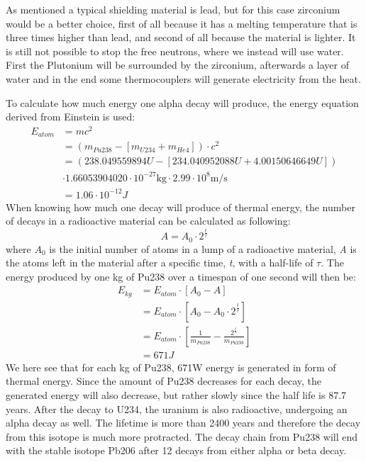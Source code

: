 As mentioned a typical shielding material is lead, but for this case zirconium would be a better choice, first of all because it has a melting temperature that is three times higher than lead, and second of all because the material is lighter. It is still not possible to stop the free neutrons, where we instead will use water. First the Plutonium will be surrounded by the zirconium, afterwards a layer of water and in the end some thermocouplers will generate electricity from the heat. 

To calculate how much energy one alpha decay will produce, the energy equation derived from Einstein is used:
\begin{equation}
\begin{aligned} 
\text{$E_{atom}$} & ={} mc^2 \\
& = (m_{Pu238} - [m_{U234} + m_{He4}]) \cdot c^2 \\
& = (238.049559894U - [234.040952088U + 4.00150646649U])\\
& \cdot 1.66053904020\cdot 10^{-27}\text{kg} \cdot 2.99\cdot 10^8 \text{m/s}\\
& = 1.06\cdot 10^{-12} J 
\end{aligned}
\end{equation}
When knowing how much one decay will produce of thermal energy, the number of decays in a radioactive material can be calculated as following:
\begin{equation}
A = A_0 \cdot 2^{\frac{t}{\tau}}
\end{equation}
where \textit{$A_0$} is the initial number of atoms in a lump of a radioactive material, \textit{A} is the atoms left in the material after a specific time, \textit{t}, with a half-life of  \textit{$\tau$}. The energy produced by one kg of Pu238 over a timespan of one second will then be: 
\begin{equation}
\begin{aligned} 
\text{$E_{kg}$} & ={} E_{atom} \cdot [A_0 - A] \\
& = E_{atom} \cdot \left[A_0 - A_0 \cdot 2^{\frac{t}{\tau}}\right] \\
& = E_{atom}  \cdot \left[\frac{1}{m_{Pu238}} - \frac{2^{\frac{t}{\tau}}}{m_{Pu238}} \right] \\
& = 671 J
\end{aligned}
\end{equation}
We here see that for each kg of Pu238, 671W energy is generated in form of thermal energy. Since the amount of Pu238 decreases for each decay, the generated energy will also decrease, but rather slowly since the half life is 87.7 years. 
After the decay to U234, the uranium is also radioactive, undergoing an alpha decay as well. The lifetime is more than 2400 years and therefore the decay from this isotope is much more protracted. The decay chain from Pu238 will end with the stable isotope Pb206 after 12 decays from either alpha or beta decay. \\

